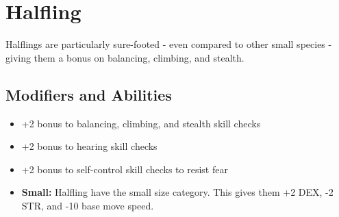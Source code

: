 \section{Halfling}\label{halfling}
Halflings are particularly sure-footed - even compared to other small species -
giving them a bonus on balancing, climbing, and stealth.

\subsection*{Modifiers and Abilities}
\begin{itemize}
    \item +2 bonus to balancing, climbing, and stealth skill checks
    \item +2 bonus to hearing skill checks
    \item +2 bonus to self-control skill checks to resist fear
    \item \textbf{Small:} Halfling have the small size category. This gives
        them +2 DEX, -2 STR, and -10 base move speed.
\end{itemize}
